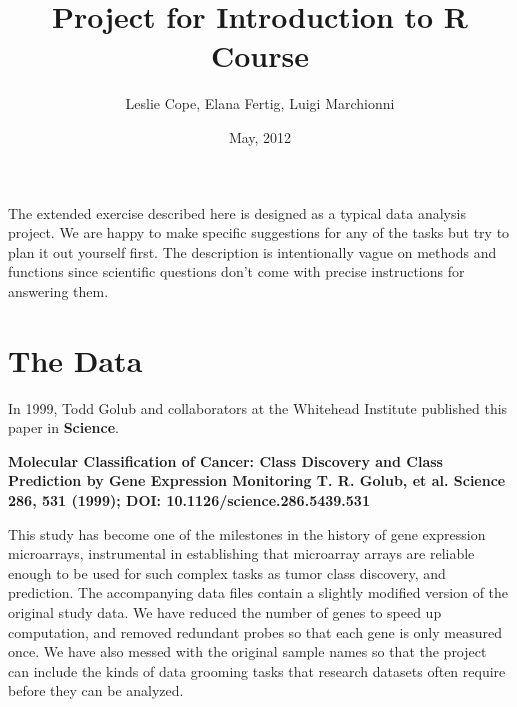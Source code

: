 \documentclass[11pt]{article}
\title{Project for Introduction to R Course}
\author{Leslie Cope, Elana Fertig, Luigi Marchionni}
\date{May, 2012}
\begin{document}
\maketitle
The extended exercise described here is designed as a typical data analysis project.   We are happy to make specific suggestions for any of the tasks but  try to plan it out yourself first.  The description is intentionally vague on methods and functions since scientific questions don't come with precise instructions for answering them. 
\section*{The Data}
In 1999, Todd Golub and collaborators at the Whitehead Institute published this paper in {\bf Science}.  

{\bf Molecular Classification of Cancer: Class Discovery and Class Prediction by Gene Expression Monitoring T. R. Golub, et al. Science 286, 531 (1999);
DOI: 10.1126/science.286.5439.531}

This study has become one of the milestones in the history of gene expression microarrays, instrumental in establishing that microarray arrays are reliable enough to be used for such complex tasks as tumor class discovery, and prediction.
The accompanying data files contain a slightly modified version of the original study data. We have reduced the number of genes to speed up computation, and removed redundant probes so that each gene is only measured once.   We have also messed with the original sample names so that the project can include the kinds of data grooming tasks that research datasets often require before they can be analyzed.    
\end{document}
